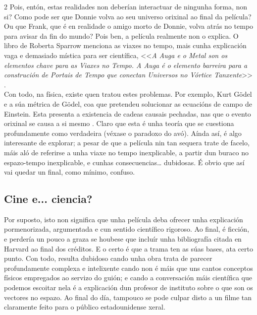 \begin{multicols}{2}
Pois, entón, estas realidades non deberían interactuar de ningunha forma, non
si? Como pode ser que Donnie volva ao seu universo orixinal ao final da
película? Ou que Frank, que é en realidade o amigo morto de Donnie, volva atrás
no tempo para avisar da fin do mundo? Pois ben, a película realmente non o
explica. O libro de Roberta Sparrow menciona as viaxes no tempo, mais cunha
explicación vaga e demasiado mística para ser científica, <<\textit{A Auga e o
Metal son os elementos chave para as Viaxes no Tempo. A Auga é o elemento
barreira para a construción de Portais de Tempo que conectan Universos no
Vórtice Tanxente}>> \cite{donnie_darko}.\\

Con todo, na física, existe quen tratou estes problemas. Por exemplo, Kurt
Gödel e a súa métrica de Gödel, coa que pretendeu solucionar as ecuacións de
campo de Einstein. Esta presenta a existencia de cadeas causais pechadas, nas
que o evento orixinal se causa a si mesmo \cite{nunez.r_2021}. Claro que esta é unha
teoría que se cuestiona profundamente como verdadeira (véxase o paradoxo do
avó). Aínda así, é algo interesante de explorar; a pesar de que a película nin
tan sequera trate de facelo, máis aló de referirse a unha viaxe no tempo
inexplicable, a partir dun buraco no espazo-tempo inexplicable, e cunhas
consecuencias… dubidosas. É obvio que así vai quedar un final, como mínimo,
confuso.

\subsection*{Cine e... ciencia?}

Por suposto, isto non significa que unha película deba ofrecer unha explicación
pormenorizada, argumentada e cun sentido científico rigoroso. Ao final, é
ficción, e perdería un pouco a graza se houbese que incluír unha bibliografía
citada en Harvard ao final dos créditos. E o certo é que a trama ten as súas
bases, ata certo punto. Con todo, resulta dubidoso cando unha obra trata de
parecer profundamente complexa e intelixente cando non é máis que uns cantos
conceptos físicos empregados ao servizo do guión; e cando a conversación máis
científica que podemos escoitar nela é a explicación dun profesor de instituto
sobre o que son os vectores no espazo. Ao final do día, tampouco se pode culpar
disto a un filme tan claramente feito para o público estadounidense xeral.

\nocite{deutsch.m_1994}
\nocite{donnie_darko}
\nocite{gribbin.j_2020}
\nocite{nunez.r_2021}
\nocite{wisecrack_2019}

\printbibliography

\end{multicols}
